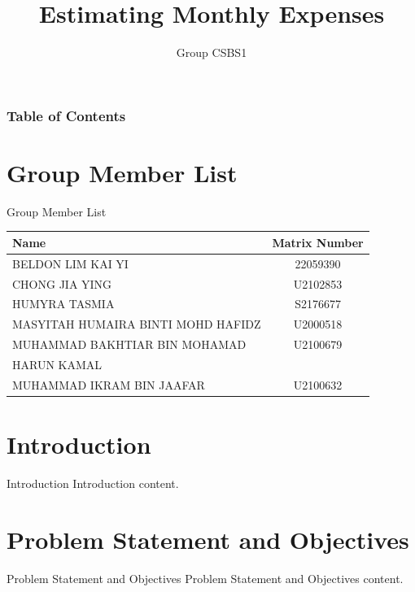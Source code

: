 \documentclass[10pt]{beamer}
\title[Estimating Monthly Expenses]{Estimating Monthly Expenses}
\subtitle{Group CSBS1}
\institute[WID3015 Numerical Analysis]{Supervisor: Dr Suzan J. Obaiys}
\date[Universiti Malaya]
\newenvironment{tres important}[2][]{
	\setkeys{EmphEqEnv}{#2}
	\setkeys{EmphEqOpt}{box={\setlength{\fboxsep}{10pt}\fcolorbox{myNewColorA}{white}},#1}
	\EmphEqMainEnv}
{\endEmphEqMainEnv}
\begin{document}
\begin{frame}
    \titlepage
\end{frame}

\begin{frame}
    \frametitle{Table of Contents}
    \tableofcontents
\end{frame}

\section{Group Member List}
\begin{frame}{Group Member List}
    \begin{table}
    \begin{center}
    \small
        \begin{tabular}{|l|c|}
            \hline
            \textbf{Name} & \textbf{Matrix Number} \\ \hline
            BELDON LIM KAI YI  & 22059390  \\ \hline
            CHONG JIA YING  & U2102853  \\ \hline
            HUMYRA TASMIA  & S2176677  \\ \hline
            MASYITAH HUMAIRA BINTI MOHD HAFIDZ  & U2000518  \\ \hline
            MUHAMMAD BAKHTIAR BIN MOHAMAD  & U2100679 \\
            HARUN KAMAL  &  \\ \hline
            MUHAMMAD IKRAM BIN JAAFAR  & U2100632  \\ \hline
        \end{tabular}
    \end{center}
    \end{table}
\end{frame}

\section{Introduction}
\begin{frame}{Introduction}
    Introduction content.
\end{frame}

\section{Problem Statement and Objectives}
\begin{frame}{Problem Statement and Objectives}
    Problem Statement and Objectives content.
\end{frame}
\end{document}
